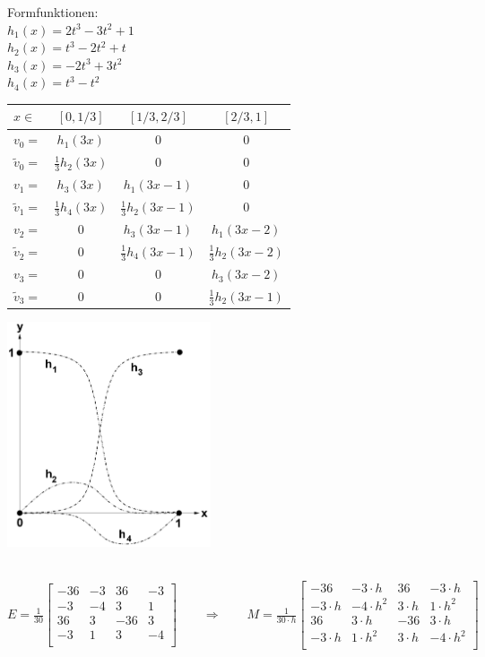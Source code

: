 \begin{minipage}{4cm}
Formfunktionen:\\
$h_1(x)=2t^3-3t^2+1$\\
$h_2(x)=t^3-2t^2+t$\\
$h_3(x)=-2t^3+3t^2$\\
$h_4(x)=t^3-t^2$
\end{minipage}
\hfill
\begin{minipage}{8cm}
	\begin{tabular}{lc|c|c}
		$x\in$&$[0,1/3]$&$[1/3,2/3]$&$[2/3,1]$\\
		\hline
		$v_0=$&$h_1(3x)$&$0$&$0$\\
		$\tilde{v}_0=$&$\frac 13 h_2(3x)$&$0$&$0$\\
		$v_1=$&$h_3(3x)$&$h_1(3x-1)$&$0$\\
		$\tilde{v}_1=$&$\frac 13 h_4(3x)$&$\frac 13 h_2(3x-1)$&$0$\\
		$v_2=$&$0$&$h_3(3x-1)$&$h_1(3x-2)$\\
		$\tilde{v}_2=$&$0$&$\frac 13 h_4(3x-1)$&$\frac 13 h_2(3x-2)$\\
		$v_3=$&$0$&$0$&$h_3(3x-2)$\\
		$\tilde{v}_3=$&$0$&$0$&$\frac 13 h_2(3x-1)$\\
	\end{tabular}
\end{minipage}
\hfill
\begin{minipage}{6cm}
\includegraphics[width=6cm]{Content/Numerik/FEM3Ord}
\end{minipage}\\
$E=\frac{1}{30}
\begin{bmatrix}
	-36 & -3 & 36 & -3\\
	-3 & -4 & 3 & 1\\
	36 & 3 & -36 & 3\\
	-3 & 1 & 3 & -4\\
\end{bmatrix}\qquad\Rightarrow\qquad
\boxed{M=\frac{1}{30\cdot h}
\begin{bmatrix}
	-36 & -3\cdot h & 36 & -3\cdot h\\
	-3\cdot h & -4\cdot h^2 & 3\cdot h & 1\cdot h^2\\
	36 & 3\cdot h & -36 & 3\cdot h\\
	-3\cdot h & 1\cdot h^2 & 3\cdot h & -4\cdot h^2\\
\end{bmatrix}}$\\
\\


